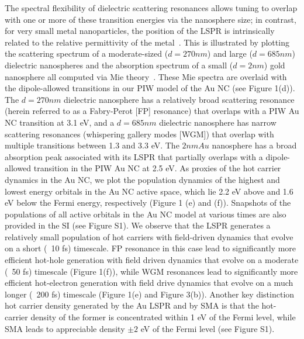 \documentclass[journal=jpclcd,manuscript=article]{achemso}
\begin{document}
The spectral flexibility of dielectric scattering
resonances allows tuning to overlap with one or more of these transition energies via the nanosphere size; in contrast, for very small 
metal nanoparticles, the position of the LSPR is intrinsically related to the relative permittivity of the metal~\cite{Bohren}.  This is
illustrated by plotting the scattering spectrum of a moderate-sized ($d=270nm$) and large ($d=685nm$) dielectric nanospheres and the 
absorption spectrum of a small ($d=2nm$) gold nanosphere all computed via Mie theory~\cite{Bohren}.  These Mie spectra are overlaid with the dipole-allowed
transitions in our PIW model of the Au NC (see Figure 1(d)). The $d=270nm$ dielectric nanosphere has a relatively broad scattering resonance 
(herein referred to as a Fabry-Perot [FP] resonance) that overlaps 
with a PIW Au NC transition at 3.1 eV, and
a $d=685nm$ dielectric nanosphere has narrow scattering resonances (whispering gallery modes [WGM]) 
that overlap with multiple transitions between 1.3 and 3.3 eV.  The $2nm Au$ nanosphere has a broad absorption peak associated with its LSPR that partially
overlaps with a dipole-allowed transition in the PIW Au NC at 2.5 eV. 
As proxies of the hot carrier dynamics in the Au NC, we plot the population dynamics of the highest and lowest energy orbitals in the Au NC active space, which lie
2.2 eV above and 1.6 eV below the Fermi energy, respectively (Figure 1 (e) and (f)).  Snapshots of the populations of all active
orbitals in the Au NC model at various times are also provided in the SI (see Figure S1).  
We observe that the LSPR generates a relatively small
population of hot carriers with field-driven dynamics that evolve on a short (~10 fs) timescale.  FP resonance in this
case lead to significantly more efficient hot-hole generation with field driven dynamics that evolve on a moderate (~50 fs) timescale (Figure 1(f)), while
WGM resonances lead to significantly more efficient hot-electron generation with field drive dynamics that evolve on a much longer (~200 fs) timescale
(Figure 1(e) and Figure 3(b)).  Another key distinction hot carrier density generated by the Au LSPR and by SMA is that the hot-carrier density
of the former is concentrated within 1 eV of the Fermi level, while SMA leads to appreciable density $\pm 2$ eV of the Fermi level (see Figure S1).
\end{document}
